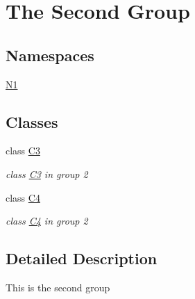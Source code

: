 \hypertarget{group__group2}{\section{The Second Group}
\label{group__group2}
}
\subsection*{Namespaces}
\begin{DoxyCompactItemize}
\item 
\hyperlink{namespaceN1}{N1}
\end{DoxyCompactItemize}
\subsection*{Classes}
\begin{DoxyCompactItemize}
\item 
class \hyperlink{classC3}{C3}
\begin{DoxyCompactList}\small\item\em class \hyperlink{classC3}{C3} in group 2 \end{DoxyCompactList}\item 
class \hyperlink{classC4}{C4}
\begin{DoxyCompactList}\small\item\em class \hyperlink{classC4}{C4} in group 2 \end{DoxyCompactList}\end{DoxyCompactItemize}


\subsection{Detailed Description}
This is the second group 